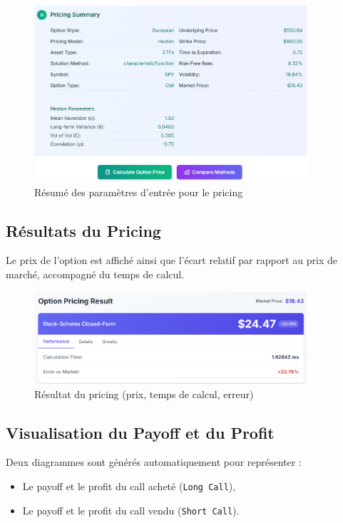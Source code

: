 \begin{figure}[H] \centering \includegraphics[width=0.9\textwidth]{images/6.png} \caption{Résumé des paramètres d'entrée pour le pricing} \end{figure}

\subsection{Résultats du Pricing}

Le prix de l'option est affiché ainsi que l'écart relatif par rapport au prix de marché, accompagné du temps de calcul.

\begin{figure}[H] \centering \includegraphics[width=0.9\textwidth]{images/7.png} \caption{Résultat du pricing (prix, temps de calcul, erreur)} \end{figure}

\subsection{Visualisation du Payoff et du Profit}

Deux diagrammes sont générés automatiquement pour représenter :

\begin{itemize} \item Le payoff et le profit du call acheté (\texttt{Long Call}), \item Le payoff et le profit du call vendu (\texttt{Short Call}). \end{itemize}


